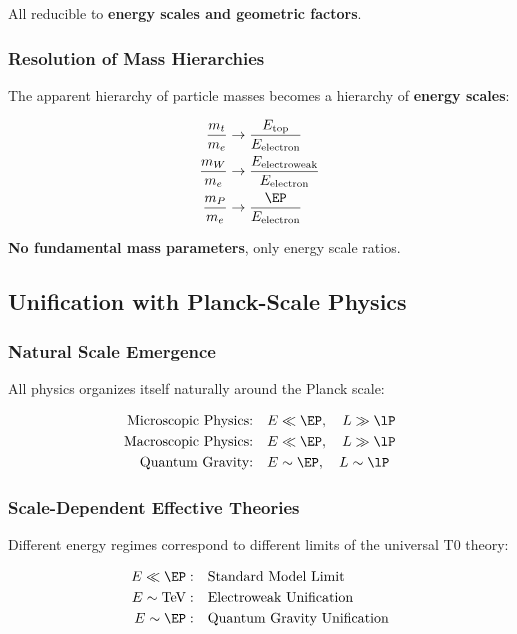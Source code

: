 	All reducible to \textbf{energy scales and geometric factors}.
	
	\subsubsection{Resolution of Mass Hierarchies}
	
	The apparent hierarchy of particle masses becomes a hierarchy of \textbf{energy scales}:
	
	\begin{align}
		\frac{m_t}{m_e} &\rightarrow \frac{E_{\text{top}}}{E_{\text{electron}}} \\
		\frac{m_W}{m_e} &\rightarrow \frac{E_{\text{electroweak}}}{E_{\text{electron}}} \\
		\frac{m_P}{m_e} &\rightarrow \frac{\EP}{E_{\text{electron}}}
	\end{align}
	
	\textbf{No fundamental mass parameters}, only energy scale ratios.
	
	\subsection{Unification with Planck-Scale Physics}
	\label{subsec:planck_unification}
	
	\subsubsection{Natural Scale Emergence}
	
	All physics organizes itself naturally around the Planck scale:
	
	\begin{align}
		\text{Microscopic Physics:} \quad &E \ll \EP, \quad L \gg \lP \\
		\text{Macroscopic Physics:} \quad &E \ll \EP, \quad L \gg \lP \\
		\text{Quantum Gravity:} \quad &E \sim \EP, \quad L \sim \lP
	\end{align}
	
	\subsubsection{Scale-Dependent Effective Theories}
	
	Different energy regimes correspond to different limits of the universal T0 theory:
	
	\begin{align}
		E \ll \EP: \quad &\text{Standard Model Limit} \\
		E \sim \text{TeV}: \quad &\text{Electroweak Unification} \\
		E \sim \EP: \quad &\text{Quantum Gravity Unification}
	\end{align}
	
